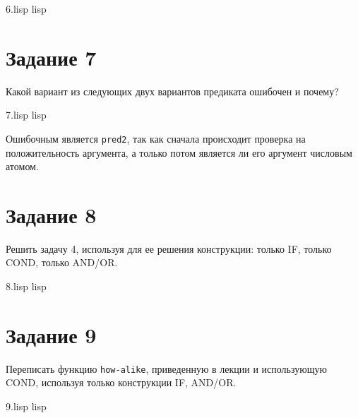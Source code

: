 {6.lisp}
{lisp}
{}

\clearpage

\section{Задание 7}
Какой вариант из следующих двух вариантов предиката ошибочен и почему?

{7.lisp}
{lisp}
{}

Ошибочным является \texttt{pred2}, так как сначала происходит проверка на положительность аргумента, а только потом является ли его аргумент числовым атомом.

\section{Задание 8}
Решить задачу 4, используя для ее решения конструкции: только IF, только COND, только AND/OR.

{8.lisp}
{lisp}
{}

\section{Задание 9}
Переписать функцию \texttt{how-alike}, приведенную в лекции и использующую COND, используя только конструкции IF, AND/OR.

{9.lisp}
{lisp}
{}

